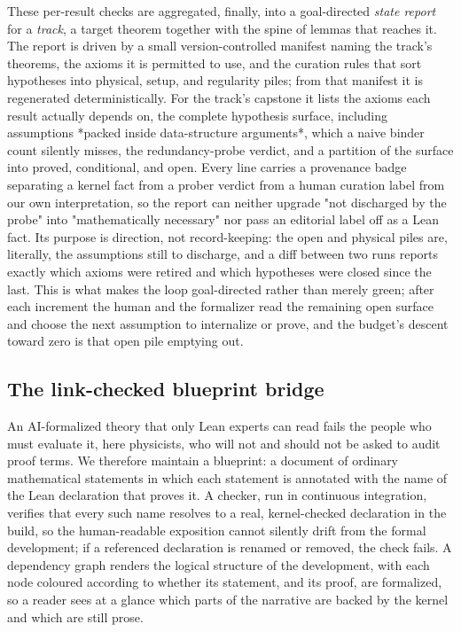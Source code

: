 \documentclass[11pt]{article}
\begin{document}
These per-result checks are aggregated, finally, into a goal-directed \emph{state report} for a \emph{track},
a target theorem together with the spine of lemmas that reaches it. The report is driven by a small
version-controlled manifest naming the track's theorems, the axioms it is permitted to use, and the
curation rules that sort hypotheses into physical, setup, and regularity piles; from that manifest it
is regenerated deterministically. For the track's capstone it lists the axioms each result actually
depends on, the complete hypothesis surface, including assumptions *packed inside data-structure
arguments*, which a naive binder count silently misses, the redundancy-probe verdict, and a
partition of the surface into proved, conditional, and open. Every line carries a provenance badge
separating a kernel fact from a prober verdict from a human curation label from our own
interpretation, so the report can neither upgrade "not discharged by the probe" into "mathematically
necessary" nor pass an editorial label off as a Lean fact. Its purpose is direction, not
record-keeping: the open and physical piles are, literally, the assumptions still to discharge, and a
diff between two runs reports exactly which axioms were retired and which hypotheses were closed since
the last. This is what makes the loop goal-directed rather than merely green; after each increment
the human and the formalizer read the remaining open surface and choose the next assumption to
internalize or prove, and the budget's descent toward zero is that open pile emptying out.

\subsection{The link-checked blueprint bridge}

An AI-formalized theory that only Lean experts can read fails the people who must evaluate it, here
physicists, who will not and should not be asked to audit proof terms. We therefore maintain a
blueprint: a document of ordinary mathematical statements in which each statement is annotated with
the name of the Lean declaration that proves it. A checker, run in continuous integration, verifies
that every such name resolves to a real, kernel-checked declaration in the build, so the
human-readable exposition cannot silently drift from the formal development; if a referenced
declaration is renamed or removed, the check fails. A dependency graph renders the logical structure
of the development, with each node coloured according to whether its statement, and its proof, are
formalized, so a reader sees at a glance which parts of the narrative are backed by the kernel and
which are still prose.
\end{document}
